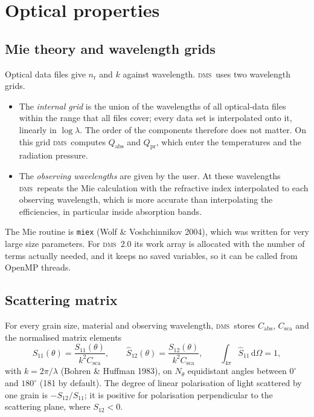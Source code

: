 \documentclass[11pt,a4paper]{article}
\newcommand{\dms}{\textsc{dms}}
\newcommand{\code}[1]{\texttt{#1}}
\newcommand{\dd}{\mathrm{d}}
\begin{document}
\section{Optical properties}
\label{sec:optics}

\subsection{Mie theory and wavelength grids}

Optical data files give $n_\mathrm{r}$ and $k$ against wavelength. \dms\ uses two wavelength
grids.
\begin{itemize}
\item The \emph{internal grid} is the union of the wavelengths of all optical-data files within the
      range that all files cover; every data set is interpolated onto it, linearly in
      $\log\lambda$. The order of the components therefore does not matter. On this grid \dms\
      computes $Q_\mathrm{abs}$ and $Q_\mathrm{pr}$, which enter the temperatures and the radiation
      pressure.
\item The \emph{observing wavelengths} are given by the user. At these wavelengths \dms\ repeats the Mie
      calculation with the refractive index interpolated to each observing wavelength, which is
      more accurate than interpolating the efficiencies, in particular inside absorption bands.
\end{itemize}
The Mie routine is \code{miex} (Wolf \& Voshchinnikov 2004), which was written for very large
size parameters. For \dms\ 2.0 its work array is allocated with the number of terms actually
needed, and it keeps no saved variables, so it can be called from OpenMP threads.

\subsection{Scattering matrix}

For every grain size, material and observing wavelength, \dms\ stores
$C_\mathrm{abs}$, $C_\mathrm{sca}$ and the normalised matrix elements
\begin{equation}
\hat S_{11}(\theta) = \frac{S_{11}(\theta)}{k^2C_\mathrm{sca}},\qquad
\hat S_{12}(\theta) = \frac{S_{12}(\theta)}{k^2C_\mathrm{sca}},\qquad
\int_{4\pi}\hat S_{11}\,\dd\Omega = 1,
\end{equation}
with $k=2\pi/\lambda$ (Bohren \& Huffman 1983), on $N_\theta$ equidistant angles between
$0^\circ$ and $180^\circ$ (181 by default). The degree of linear polarisation of light scattered by
one grain is $-S_{12}/S_{11}$; it is positive for polarisation perpendicular to the scattering
plane, where $S_{12}<0$.
\end{document}

